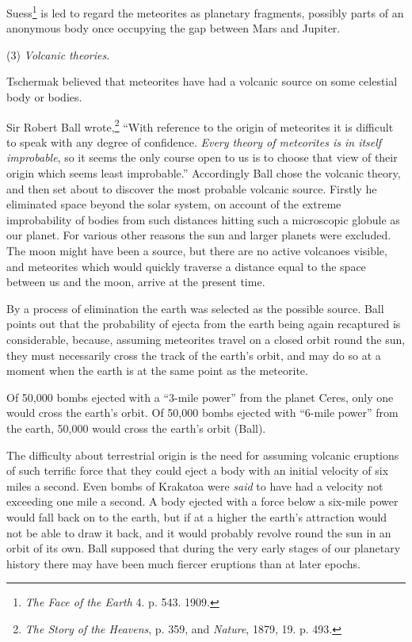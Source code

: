 \documentclass[a4paper, 12pt, oneside]{article}
\begin{document}
Suess\footnote{\emph{The Face of the Earth} 4. p. 543. 1909.} is led to regard the meteorites as planetary fragments, possibly parts of an anonymous body once occupying the gap between Mars and Jupiter.

(3) \emph{Volcanic theories}.

Tschermak believed that meteorites have had a volcanic source on some celestial body or bodies.

Sir Robert Ball wrote,\footnote{\emph{The Story of the Heavens}, p. 359, and \emph{Nature}, 1879, 19. p. 493.} ``With reference to the origin of meteorites it is difficult to speak with any degree of confidence. \emph{Every theory of meteorites is in itself improbable}, so it seems the only course open to us is to choose that view of their origin which seems least improbable.'' Accordingly Ball chose the volcanic theory, and then set about to discover the most probable volcanic source. Firstly he eliminated space beyond the solar system, on account of the extreme improbability of bodies from such distances hitting such a microscopic globule as our planet. For various other reasons the sun and larger planets were excluded. The moon might have been a source, but there are no active volcanoes visible, and meteorites which would quickly traverse a distance equal to the space between us and the moon, arrive at the present time.

By a process of elimination the earth was selected as the possible source. Ball points out that the probability of ejecta from the earth being again recaptured is considerable, because, assuming meteorites travel on a closed orbit round the sun, they must necessarily cross the track of the earth's orbit, and may do so at a moment when the earth is at the same point as the meteorite.

Of 50,000 bombs ejected with a ``3-mile power'' from the planet Ceres, only one would cross the earth's orbit. Of 50,000 bombs ejected with ``6-mile power'' from the earth, 50,000 would cross the earth's orbit (Ball).

The difficulty about terrestrial origin is the need for assuming volcanic eruptions of such terrific force that they could eject a body with an initial velocity of six miles a second. Even bombs of Krakatoa were \emph{said} to have had a velocity not exceeding one mile a second. A body ejected with a force below a six-mile power would fall back on to the earth, but if at a higher the earth's attraction would not be able to draw it back, and it would probably revolve round the sun in an orbit of its own. Ball supposed that during the very early stages of our planetary history there may have been much fiercer eruptions than at later epochs.
\end{document}

